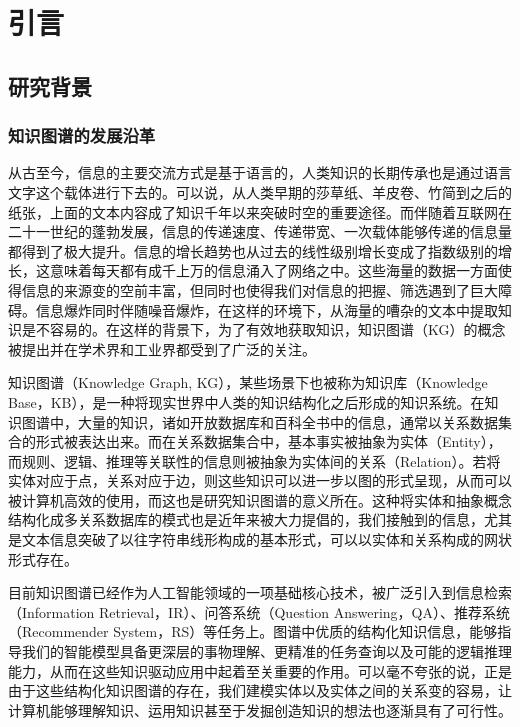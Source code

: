 \chapter{引言}
\label{cha:intro}


\section{研究背景}

\subsection{知识图谱的发展沿革}

从古至今，信息的主要交流方式是基于语言的，人类知识的长期传承也是通过语言文字这个载体进行下去的。可以说，从人类早期的莎草纸、羊皮卷、竹简到之后的纸张，上面的文本内容成了知识千年以来突破时空的重要途径。而伴随着互联网在二十一世纪的蓬勃发展，信息的传递速度、传递带宽、一次载体能够传递的信息量都得到了极大提升。信息的增长趋势也从过去的线性级别增长变成了指数级别的增长，这意味着每天都有成千上万的信息涌入了网络之中。这些海量的数据一方面使得信息的来源变的空前丰富，但同时也使得我们对信息的把握、筛选遇到了巨大障碍。信息爆炸同时伴随噪音爆炸，在这样的环境下，从海量的嘈杂的文本中提取知识是不容易的。在这样的背景下，为了有效地获取知识，知识图谱（KG）的概念被提出并在学术界和工业界都受到了广泛的关注。

知识图谱（Knowledge Graph, KG），某些场景下也被称为知识库（Knowledge Base，KB），是一种将现实世界中人类的知识结构化之后形成的知识系统。在知识图谱中，大量的知识，诸如开放数据库和百科全书中的信息，通常以关系数据集合的形式被表达出来。而在关系数据集合中，基本事实被抽象为实体（Entity），而规则、逻辑、推理等关联性的信息则被抽象为实体间的关系（Relation）。若将实体对应于点，关系对应于边，则这些知识可以进一步以图的形式呈现，从而可以被计算机高效的使用，而这也是研究知识图谱的意义所在。这种将实体和抽象概念结构化成多关系数据库的模式也是近年来被大力提倡的，我们接触到的信息，尤其是文本信息突破了以往字符串线形构成的基本形式，可以以实体和关系构成的网状形式存在。

目前知识图谱已经作为人工智能领域的一项基础核心技术，被广泛引入到信息检索（Information Retrieval，IR）、问答系统（Question Answering，QA）、推荐系统（Recommender System，RS）等任务上。图谱中优质的结构化知识信息，能够指导我们的智能模型具备更深层的事物理解、更精准的任务查询以及可能的逻辑推理能力，从而在这些知识驱动应用中起着至关重要的作用。可以毫不夸张的说，正是由于这些结构化知识图谱的存在，我们建模实体以及实体之间的关系变的容易，让计算机能够理解知识、运用知识甚至于发掘创造知识的想法也逐渐具有了可行性。

